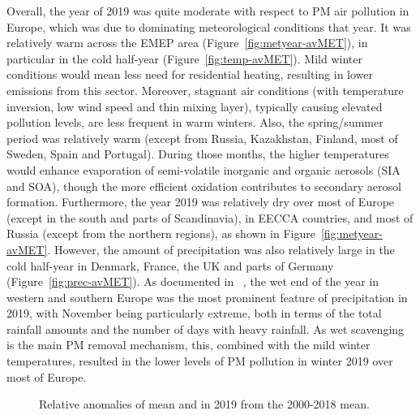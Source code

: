 Overall, the year of 2019 was quite moderate with respect to PM air pollution in Europe, which was due to dominating meteorological conditions that year. It was relatively warm across the EMEP area (Figure~\ref{fig:metyear-avMET}), in particular in the cold half-year (Figure~\ref{fig:temp-avMET}). Mild winter conditions would mean less need for residential heating, resulting in lower emissions from this sector. Moreover, stagnant air conditions (with temperature inversion, low wind speed and thin mixing layer), typically causing elevated pollution levels, are less frequent in warm winters. Also, the spring/summer period was relatively warm (except from Russia, Kazakhstan, Finland, most of Sweden, Spain and Portugal). During those months, the higher temperatures would enhance evaporation of semi-volatile inorganic and organic aerosols (SIA and SOA), though the more efficient oxidation contributes to secondary aerosol formation. Furthermore, the year 2019 was relatively dry over most of Europe (except in the south and parts of Scandinavia), in EECCA countries, and most of Russia (except from the northern regions), as shown in Figure~\ref{fig:metyear-avMET}. However, the amount of precipitation was also relatively large in the cold half-year in Denmark, France, the UK and parts of Germany (Figure~\ref{fig:prec-avMET}). As documented in ~\citep{CAMS2020}, the wet end of the year in western and southern Europe was the most prominent feature of precipitation in 2019, with 
November being particularly extreme, both in terms of the total rainfall amounts and the number of days with heavy rainfall. As wet scavenging is the main PM removal mechanism, this, combined with the mild winter temperatures, resulted in the lower levels of PM pollution in winter 2019 over most of Europe.   

\begin{figure}[H]
\caption{Relative anomalies of mean \PM[10] and \PM[2.5] in 2019 from the 2000-2018 mean.}
\label{fig:PManomin2019}
\end{figure}


